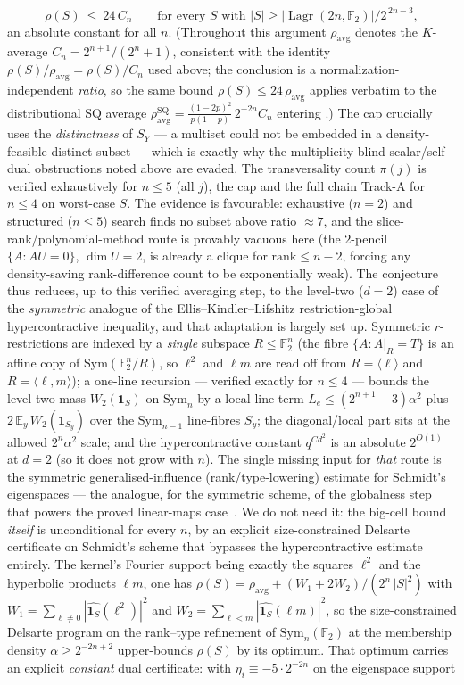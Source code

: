 \documentclass[11pt,a4paper]{article}
\theoremstyle{plain}
\theoremstyle{definition}
\newcommand{\F}{\mathbb{F}}
\DeclareMathOperator{\Lagr}{Lagr}
\begin{document}
\[
  \rho(S)\ \le\ 24\,C_n\qquad\text{for every }S\text{ with }|S|\ge|\Lagr(2n,\F_2)|/2^{\,2n-3},
\]
an absolute constant for all $n$. (Throughout this argument $\rho_{\mathrm{avg}}$ denotes the $K$-average $C_n=2^{n+1}/(2^n+1)$, consistent with the identity $\rho(S)/\rho_{\mathrm{avg}}=\rho(S)/C_n$ used above; the conclusion is a normalization-independent \emph{ratio}, so the same bound $\rho(S)\le24\,\rho_{\mathrm{avg}}$ applies verbatim to the distributional SQ average $\rho_{\mathrm{avg}}^{\mathrm{SQ}}=\tfrac{(1-2p)^2}{p(1-p)}\,2^{-2n}C_n$ entering .) The cap crucially uses the \emph{distinctness} of $S_Y$ --- a multiset could not be embedded in a density-feasible distinct subset --- which is exactly why the multiplicity-blind scalar/self-dual obstructions noted above are evaded. The transversality count $\pi(j)$ is verified exhaustively for $n\le5$ (all $j$), the cap and the full chain Track-A for $n\le4$ on worst-case $S$. The evidence is favourable: exhaustive ($n=2$) and structured ($n\le 5$) search finds no subset above ratio $\approx 7$, and the slice-rank/polynomial-method route is provably vacuous here (the $2$-pencil $\{A:AU=0\}$, $\dim U=2$, is already a clique for $\mathrm{rank}\le n-2$, forcing any density-saving rank-difference count to be exponentially weak). The conjecture thus reduces, up to this verified averaging step, to the level-two ($d=2$) case of the \emph{symmetric} analogue of the Ellis--Kindler--Lifshitz restriction-global hypercontractive inequality, and that adaptation is largely set up. Symmetric $r$-restrictions are indexed by a \emph{single} subspace $R\le\F_2^n$ (the fibre $\{A:A|_R=T\}$ is an affine copy of $\mathrm{Sym}(\F_2^n/R)$, so $\ell^2$ and $\ell m$ are read off from $R=\langle\ell\rangle$ and $R=\langle\ell,m\rangle$); a one-line recursion --- verified exactly for $n\le 4$ --- bounds the level-two mass $W_2(\mathbf 1_S)$ on $\mathrm{Sym}_n$ by a local line term $L_e\le(2^{n+1}-3)\alpha^2$ plus $2\,\mathbb E_y\,W_2(\mathbf 1_{S_y})$ over the $\mathrm{Sym}_{n-1}$ line-fibres $S_y$; the diagonal/local part sits at the allowed $2^n\alpha^2$ scale; and the hypercontractive constant $q^{Cd^2}$ is an absolute $2^{O(1)}$ at $d=2$ (so it does not grow with $n$). The single missing input for \emph{that} route is the symmetric generalised-influence (rank/type-lowering) estimate for Schmidt's eigenspaces --- the analogue, for the symmetric scheme, of the globalness step that powers the proved linear-maps case~\cite{EKL2022}. We do not need it: the big-cell bound \emph{itself} is unconditional for every $n$, by an explicit size-constrained Delsarte certificate on Schmidt's scheme that bypasses the hypercontractive estimate entirely. The kernel's Fourier support being exactly the squares $\ell^2$ and the hyperbolic products $\ell m$, one has $\rho(S)=\rho_{\mathrm{avg}}+(W_1+2W_2)/(2^n\,|S|^2)$ with $W_1=\sum_{\ell\neq0}|\widehat{\mathbf 1_S}(\ell^2)|^2$ and $W_2=\sum_{\ell<m}|\widehat{\mathbf 1_S}(\ell m)|^2$, so the size-constrained Delsarte program on the rank--type refinement of $\mathrm{Sym}_n(\F_2)$ at the membership density $\alpha\ge 2^{-2n+2}$ upper-bounds $\rho(S)$ by its optimum. That optimum carries an explicit \emph{constant} dual certificate: with $\eta_i\equiv -5\cdot 2^{-2n}$ on the eigenspace support 
\end{document}
